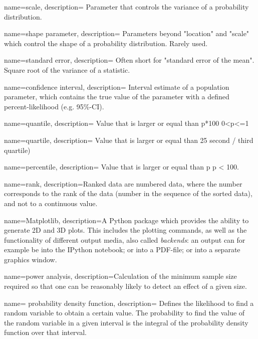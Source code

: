 {
    name=scale,
    description={ Parameter that controls the variance of a probability
    distribution.}
}

{
    name=shape parameter,
    description={ Parameters beyond "location" and "scale" which control the shape of a
    probability distribution. Rarely used.}
}

{
    name=standard error,
    description={ Often short for "standard error of the mean". Square root of the variance
    of a statistic.}
}

{
    name=confidence interval,
    description={ Interval estimate of a population parameter, which contains the true value
    of the parameter with a defined percent-likelihood (e.g. 95\%-CI).}
}

{
    name=quantile,
    description={ Value that is larger or equal than p*100%
    0<p<=1}
}

{
    name=quartile,
    description={ Value that is larger or equal than 25%
    second / third quartile)}
}

{
    name=percentile,
    description={ Value that is larger or equal than p%
    p < 100.}
}

{
    name=rank,
    description={Ranked data are numbered data, where the number corresponds to the rank of the data
    (number in the sequence of the sorted data), and not to a
    continuous value.}
}

{
        name=Matplotlib,
        description={A Python package which provides the ability to generate 2D and 3D plots. This includes the plotting commands, as well as the functionality of different output media, also called \emph{backends}: an output can for example be into the IPython notebook; or into a PDF-file; or into a separate graphics window.}
}

{
        name=power analysis,
        description={Calculation of the minimum sample size required so that one can be reasonably likely to detect an effect of a given size.}
}

{
    name= probability density function,
    description={ Defines the likelihood to find a random variable to obtain a certain
    value. The probability to find the value of the random variable in a given
    interval is the integral of the probability density function over that
    interval.}
}

